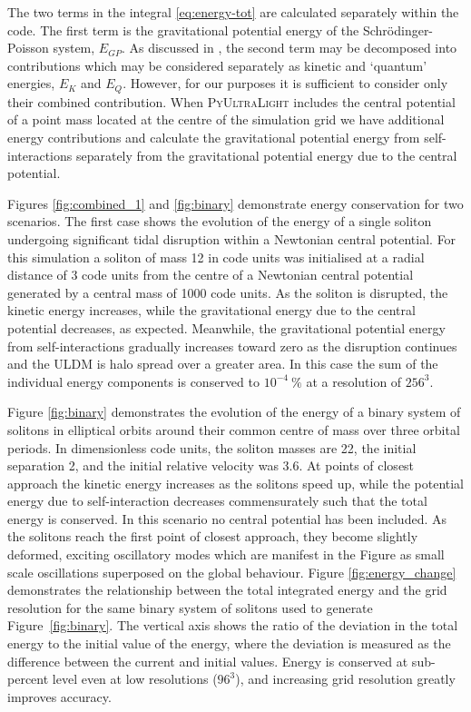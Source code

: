 \documentclass[a4paper,11pt]{article}
\newcommand{\PyUltraLight}{\textsc{PyUltraLight}\xspace}
\begin{document}
The two terms in the integral \ref{eq:energy-tot} are calculated separately within the code. The first term is the gravitational potential energy of the Schr{\"o}dinger-Poisson system, $E_{GP}$. As discussed in \cite{Hui:2016ltb}, the second term may be decomposed into contributions which may be considered separately as kinetic and `quantum' energies, $E_K$ and $E_Q$. However, for our purposes it is sufficient to consider only their combined contribution. When \PyUltraLight includes the central potential of a point mass located at the centre of the simulation grid we have additional energy contributions and calculate the  gravitational potential energy from self-interactions separately from the gravitational potential energy due to the central potential.

Figures \ref{fig:combined_1} and \ref{fig:binary} demonstrate energy conservation for two scenarios. The first case  shows the evolution of the energy of a single soliton undergoing significant tidal disruption within a Newtonian central potential. For this simulation a soliton of mass 12 in code units was initialised at a radial distance of 3 code units from the centre of a Newtonian central potential generated by a central mass of 1000 code units. As the soliton is disrupted, the kinetic energy increases, while the gravitational energy due to the central potential decreases, as expected. Meanwhile, the gravitational potential energy from self-interactions gradually increases toward zero as the disruption continues and the ULDM is halo spread over a greater area. In this case the sum of the individual energy components is conserved to $10^{-4}\ \%$  at a resolution of $256^3$.

Figure \ref{fig:binary} demonstrates the evolution of the energy of a binary system of solitons in elliptical orbits around their common centre of mass over three orbital periods. In dimensionless code units, the soliton masses are 22, the initial separation  2, and the initial relative velocity was 3.6. At points of closest approach the kinetic energy increases as the solitons speed up, while the potential energy due to self-interaction decreases commensurately such that the total energy is conserved. In this scenario no central potential has been included. As the solitons reach the first point of closest approach, they become slightly deformed, exciting oscillatory modes which are manifest in the Figure as small scale oscillations superposed on the global behaviour. Figure \ref{fig:energy_change} demonstrates the relationship between the total integrated energy and the grid resolution for the same binary system of solitons used to generate Figure~\ref{fig:binary}. The vertical axis shows the ratio of the deviation in the total energy to the initial value of the energy, where the deviation is measured as the difference between the current and initial values. Energy is conserved at sub-percent level even at low resolutions ($96^3$), and increasing grid resolution greatly improves accuracy.
\end{document}

